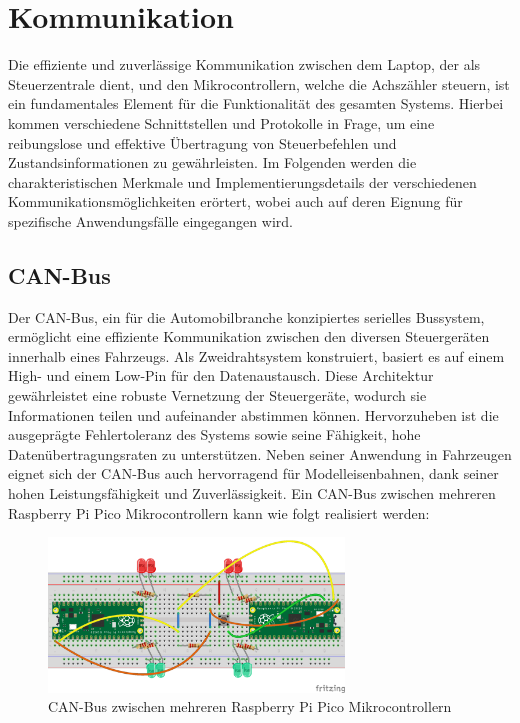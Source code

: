 \section{Kommunikation}\label{text:Methodik:Kommunikation}

Die effiziente und zuverlässige Kommunikation zwischen dem Laptop, der als Steuerzentrale dient, und den Mikrocontrollern, welche die Achszähler steuern, ist ein fundamentales Element für die Funktionalität des gesamten Systems. Hierbei kommen verschiedene Schnittstellen und Protokolle in Frage, um eine reibungslose und effektive Übertragung von Steuerbefehlen und Zustandsinformationen zu gewährleisten. Im Folgenden werden die charakteristischen Merkmale und Implementierungsdetails der verschiedenen Kommunikationsmöglichkeiten erörtert, wobei auch auf deren Eignung für spezifische Anwendungsfälle eingegangen wird.

\subsection{CAN-Bus}\label{text:Methodik:Kommunikation:CAN-Bus}

Der CAN-Bus, ein für die Automobilbranche konzipiertes serielles Bussystem, ermöglicht eine effiziente Kommunikation zwischen den diversen Steuergeräten innerhalb eines Fahrzeugs. Als Zweidrahtsystem konstruiert, basiert es auf einem High- und einem Low-Pin für den Datenaustausch. Diese Architektur gewährleistet eine robuste Vernetzung der Steuergeräte, wodurch sie Informationen teilen und aufeinander abstimmen können. Hervorzuheben ist die ausgeprägte Fehlertoleranz des Systems sowie seine Fähigkeit, hohe Datenübertragungsraten zu unterstützen. Neben seiner Anwendung in Fahrzeugen eignet sich der CAN-Bus auch hervorragend für Modelleisenbahnen, dank seiner hohen Leistungsfähigkeit und Zuverlässigkeit. Ein CAN-Bus zwischen mehreren Raspberry Pi Pico Mikrocontrollern kann wie folgt realisiert werden:

\begin{figure}[H]
    \centering
    \includegraphics[width=0.7\textwidth]{Assets/Images/3-Methodik/CANBus-Test.png}
    \caption{CAN-Bus zwischen mehreren Raspberry Pi Pico Mikrocontrollern}\label{abb:Methodik:Kommunikation:CAN-Bus}
\end{figure}

